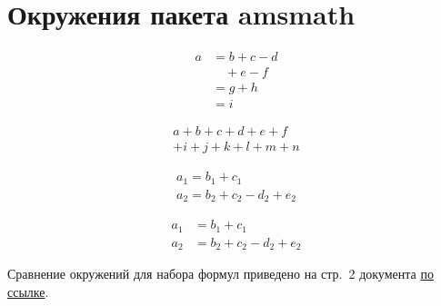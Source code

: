 \section{Окружения пакета amsmath}
\begin{equation}\label{eq:one}
\begin{split}
  a & = b+c-d\\
    & \quad +e-f\\
    & =g+h\\
    & =i
\end{split}
\end{equation}

\begin{multline}
a+b+c+d+e+f\\
+i+j+k+l+m+n
\end{multline}

\begin{gather}
a_1=b_1+c_1\\
a_2=b_2+c_2-d_2+e_2
\end{gather}

\begin{align}
a_1& =b_1+c_1\\
a_2& =b_2+c_2-d_2+e_2
\end{align}

Сравнение окружений для набора формул приведено на стр.~2 документа \href{https://goo.gl/WywBQT}{по ссылке}.